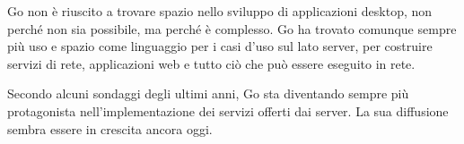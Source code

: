 Go non è riuscito a trovare spazio nello sviluppo di applicazioni desktop, non perché non sia possibile, ma perché è complesso.
Go ha trovato comunque sempre più uso e spazio come linguaggio per i casi d'uso sul lato server, per costruire servizi di rete, applicazioni web e tutto ciò che può essere eseguito in rete.

Secondo alcuni sondaggi degli ultimi anni, Go sta diventando sempre più protagonista nell'implementazione dei servizi offerti dai server.
La sua diffusione sembra essere in crescita ancora oggi.